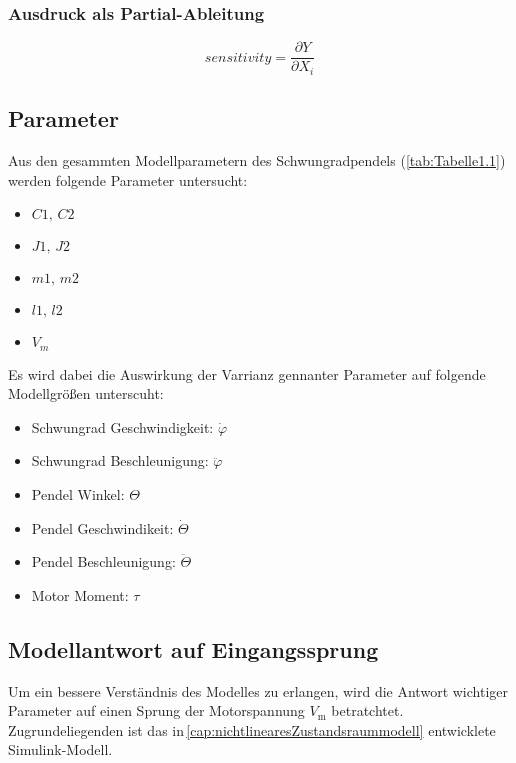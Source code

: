 \subsubsection*{Ausdruck als Partial-Ableitung}
\begin{equation}
    sensitivity=\frac{\partial Y}{\partial X_i}
\end{equation}

%    
\subsection{Parameter}
Aus den gesammten Modellparametern des Schwungradpendels (\ref{tab:Tabelle1.1}) werden folgende Parameter untersucht:
\begin{itemize}
    \item $C1,\, C2$
    \item $J1,\, J2$
    \item $m1,\, m2$
    \item $l1,\, l2$
    \item $V_m$
\end{itemize}
Es wird dabei die Auswirkung der Varrianz gennanter Parameter auf folgende Modellgrößen unterscuht:
\begin{itemize}
    \item Schwungrad Geschwindigkeit: $\dot\varphi$
    \item Schwungrad Beschleunigung: $\ddot\varphi$
    \item Pendel Winkel: $\Theta$
    \item Pendel Geschwindikeit: $\dot\Theta$
    \item Pendel Beschleunigung: $\ddot\Theta$
    \item Motor Moment: $\tau$
\end{itemize}
\subsection{Modellantwort auf Eingangssprung}
Um ein bessere Verständnis des Modelles zu erlangen, wird die Antwort wichtiger Parameter auf einen Sprung der Motorspannung $V_{\mathrm{m}}$ betratchtet.
Zugrundeliegenden ist das in\,\ref{cap:nichtlinearesZustandsraummodell} entwicklete Simulink-Modell.

%    


